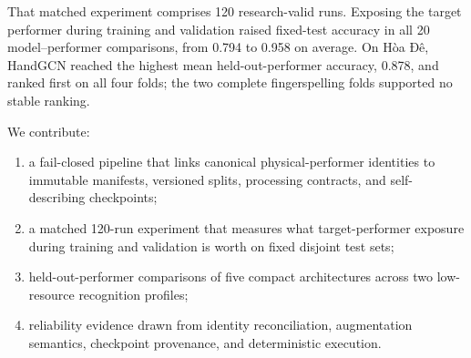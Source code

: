 That matched experiment comprises 120 research-valid runs. Exposing the target performer during training and validation raised fixed-test accuracy in all 20 model--performer comparisons, from 0.794 to 0.958 on average. On Hòa Đê, HandGCN reached the highest mean held-out-performer accuracy, 0.878, and ranked first on all four folds; the two complete fingerspelling folds supported no stable ranking.

We contribute:
\begin{enumerate}
    \item a fail-closed pipeline that links canonical physical-performer identities to immutable manifests, versioned splits, processing contracts, and self-describing checkpoints;
    \item a matched 120-run experiment that measures what target-performer exposure during training and validation is worth on fixed disjoint test sets;
    \item held-out-performer comparisons of five compact architectures across two low-resource recognition profiles;
    \item reliability evidence drawn from identity reconciliation, augmentation semantics, checkpoint provenance, and deterministic execution.
\end{enumerate}
